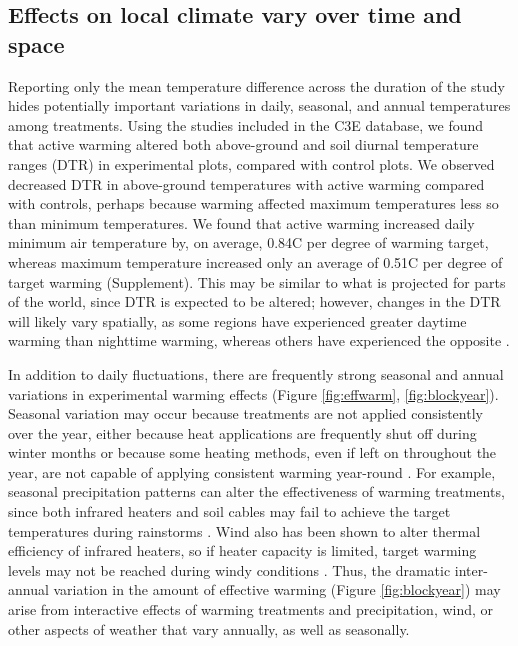 \documentclass{article}
\begin{document}
\subsection* {Effects on local climate vary over time and space}%
Reporting only the mean temperature difference across the duration of the study hides potentially important variations in daily, seasonal, and annual temperatures among treatments. Using the studies included in the C3E database, we found that active warming altered both above-ground and soil diurnal temperature ranges (DTR) in experimental plots, compared with control plots. We observed decreased DTR in above-ground temperatures with active warming compared with controls, perhaps because warming affected maximum temperatures less so than minimum temperatures. We found that active warming increased daily minimum air temperature by, on average, 0.84\degree C per degree of warming target, whereas maximum temperature increased only an average of 0.51\degree C per degree of target warming (Supplement). This may be similar to what is projected for parts of the world, since DTR is expected to be altered; however, changes in the DTR will likely vary spatially, as some regions have experienced greater daytime warming than nighttime warming, whereas others have experienced the opposite \citep{ipcc2013}. 
\par In addition to daily fluctuations, there are frequently strong seasonal and annual variations in experimental warming effects (Figure \ref{fig:effwarm}, \ref{fig:blockyear}). Seasonal variation may occur because treatments are not applied consistently over the year, either because heat applications are frequently shut off during winter months or because some heating methods, even if left on throughout the year, are not capable of applying consistent warming year-round \citep[e.g.][]{clark2014a,clark2014b,hagedorn2010}. For example, seasonal precipitation patterns can alter the effectiveness of warming treatments, since both infrared heaters and soil cables may fail to achieve the target temperatures during rainstorms \citep{peterjohn1993,hoeppner2012}. Wind also has been shown to alter thermal efficiency of infrared heaters, so if heater capacity is limited, target warming levels may not be reached during windy conditions \citep{kimball2005,kimball2008}. Thus, the dramatic inter-annual variation in the amount of effective warming (Figure \ref{fig:blockyear}) may arise from interactive effects of warming treatments and precipitation, wind, or other aspects of weather that vary annually, as well as seasonally. 
\end{document}
